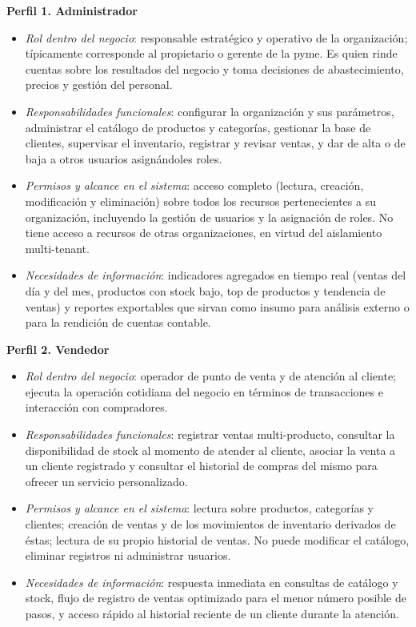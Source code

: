 \textbf{Perfil 1. Administrador}

\begin{itemize}
\tightlist
\item
  \emph{Rol dentro del negocio}: responsable estratégico y operativo de la organización; típicamente corresponde al propietario o gerente de la pyme. Es quien rinde cuentas sobre los resultados del negocio y toma decisiones de abastecimiento, precios y gestión del personal.
\item
  \emph{Responsabilidades funcionales}: configurar la organización y sus parámetros, administrar el catálogo de productos y categorías, gestionar la base de clientes, supervisar el inventario, registrar y revisar ventas, y dar de alta o de baja a otros usuarios asignándoles roles.
\item
  \emph{Permisos y alcance en el sistema}: acceso completo (lectura, creación, modificación y eliminación) sobre todos los recursos pertenecientes a su organización, incluyendo la gestión de usuarios y la asignación de roles. No tiene acceso a recursos de otras organizaciones, en virtud del aislamiento multi-tenant.
\item
  \emph{Necesidades de información}: indicadores agregados en tiempo real (ventas del día y del mes, productos con stock bajo, top de productos y tendencia de ventas) y reportes exportables que sirvan como insumo para análisis externo o para la rendición de cuentas contable.
\end{itemize}

\textbf{Perfil 2. Vendedor}

\begin{itemize}
\tightlist
\item
  \emph{Rol dentro del negocio}: operador de punto de venta y de atención al cliente; ejecuta la operación cotidiana del negocio en términos de transacciones e interacción con compradores.
\item
  \emph{Responsabilidades funcionales}: registrar ventas multi-producto, consultar la disponibilidad de stock al momento de atender al cliente, asociar la venta a un cliente registrado y consultar el historial de compras del mismo para ofrecer un servicio personalizado.
\item
  \emph{Permisos y alcance en el sistema}: lectura sobre productos, categorías y clientes; creación de ventas y de los movimientos de inventario derivados de éstas; lectura de su propio historial de ventas. No puede modificar el catálogo, eliminar registros ni administrar usuarios.
\item
  \emph{Necesidades de información}: respuesta inmediata en consultas de catálogo y stock, flujo de registro de ventas optimizado para el menor número posible de pasos, y acceso rápido al historial reciente de un cliente durante la atención.
\end{itemize}

